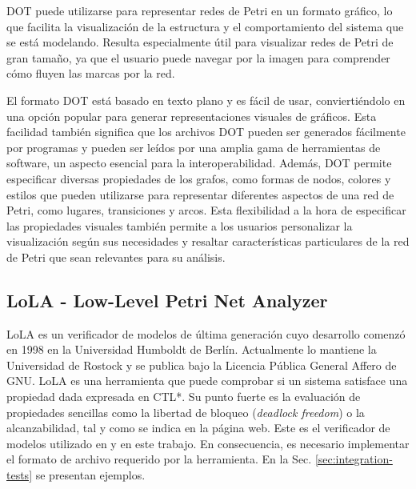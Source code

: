 DOT puede utilizarse para representar redes de Petri en un formato gráfico, lo que facilita la
visualización de la estructura y el comportamiento del sistema que se está modelando.
Resulta especialmente útil para visualizar redes de Petri de gran tamaño, ya que el usuario puede
navegar por la imagen para comprender cómo fluyen las marcas por la red.

El formato DOT está basado en texto plano y es fácil de usar, conviertiéndolo en una opción
popular para generar representaciones visuales de gráficos.
Esta facilidad también significa que los archivos DOT pueden ser generados fácilmente por programas y pueden ser leídos por una
amplia gama de herramientas de software, un aspecto esencial para la interoperabilidad.
Además, DOT permite especificar diversas propiedades de los grafos, como formas de
nodos, colores y estilos \cite{dot2015} que pueden utilizarse para representar diferentes
aspectos de una red de Petri, como lugares, transiciones y arcos. Esta flexibilidad a la hora de
especificar las propiedades visuales también permite a los usuarios personalizar la
visualización según sus necesidades y resaltar características particulares de la red de Petri que
sean relevantes para su análisis.

\subsection{LoLA - Low-Level Petri Net Analyzer}
\label{sec:lola-format}

\acrfull{LoLA} \cite{schmidt2000lola} es un verificador de modelos de
última generación cuyo desarrollo comenzó en 1998 en la Universidad Humboldt de Berlín.
Actualmente lo mantiene la Universidad de Rostock y se publica bajo la Licencia Pública
General Affero de GNU. \acrshort{LoLA} es una herramienta que puede comprobar si un sistema
satisface una propiedad dada expresada en \acrfull{CTL*}. Su punto
fuerte es la evaluación de propiedades sencillas como la libertad de bloqueo (\textit{deadlock freedom}) o la
alcanzabilidad, tal y como se indica en la página web.
Este es el verificador de modelos utilizado en \cite{meyer2020} y en este trabajo.
En consecuencia, es
necesario implementar el formato de archivo requerido por la herramienta.
En la Sec. \ref{sec:integration-tests} se presentan ejemplos.